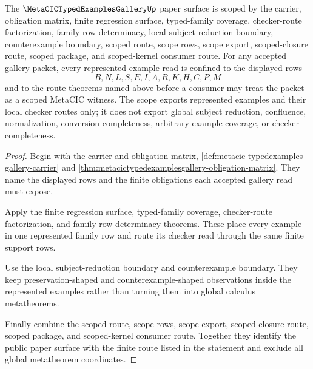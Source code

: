 \begin{theorem}
\label{thm:metacic-typedexamples-gallery-scoped-closure-status}
The $\MetaCICTypedExamplesGalleryUp$ paper surface is scoped by the carrier, obligation matrix, finite regression surface, typed-family coverage, checker-route factorization, family-row determinacy, local subject-reduction boundary, counterexample boundary, scoped route, scope rows, scope export, scoped-closure route, scoped package, and scoped-kernel consumer route. For any accepted gallery packet, every represented example read is confined to the displayed rows
$$
B,N,L,S,E,I,A,R,K,H,C,P,M
$$
and to the route theorems named above before a consumer may treat the packet as a scoped MetaCIC witness. The scope exports represented examples and their local checker routes only; it does not export global subject reduction, confluence, normalization, conversion completeness, arbitrary example coverage, or checker completeness.
\end{theorem}
\begin{proof}
Begin with the carrier and obligation matrix, \autoref{def:metacic-typedexamples-gallery-carrier} and \autoref{thm:metacictypedexamplesgallery-obligation-matrix}. They name the displayed rows and the finite obligations each accepted gallery read must expose.

Apply the finite regression surface, typed-family coverage, checker-route factorization, and family-row determinacy theorems. These place every example in one represented family row and route its checker read through the same finite support rows.

Use the local subject-reduction boundary and counterexample boundary. They keep preservation-shaped and counterexample-shaped observations inside the represented examples rather than turning them into global calculus metatheorems.

Finally combine the scoped route, scope rows, scope export, scoped-closure route, scoped package, and scoped-kernel consumer route. Together they identify the public paper surface with the finite route listed in the statement and exclude all global metatheorem coordinates.
\end{proof}

